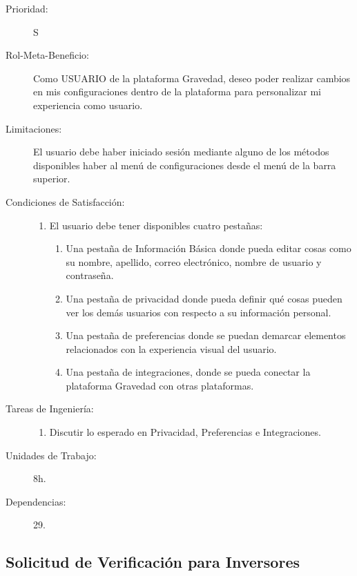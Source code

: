 \begin{description}
    \item[Prioridad:] S
    \item[Rol-Meta-Beneficio:]  Como USUARIO de la plataforma Gravedad, deseo poder realizar cambios en mis configuraciones dentro de la plataforma para personalizar mi experiencia como usuario.
    \item[Limitaciones:] El usuario debe haber iniciado sesión mediante alguno de los métodos disponibles haber al menú de configuraciones desde el menú de la barra superior.
    \item[Condiciones de Satisfacción:]  \hfill
        \begin{enumerate}
            \item El usuario debe tener disponibles cuatro pestañas:
                \begin{enumerate}
                    \item Una pestaña de Información Básica donde pueda editar cosas como su nombre, apellido, correo electrónico, nombre de usuario y contraseña.
    			    \item Una pestaña de privacidad donde pueda definir qué cosas pueden ver los demás usuarios con respecto a su información personal.
    			    \item Una pestaña de preferencias donde se puedan demarcar elementos relacionados con la experiencia visual del usuario.
    			    \item Una pestaña de integraciones, donde se pueda conectar la plataforma Gravedad con otras plataformas.
                \end{enumerate}
        \end{enumerate}
    \item[Tareas de Ingeniería:]  \hfill
        \begin{enumerate}
            \item Discutir lo esperado en Privacidad, Preferencias e Integraciones.
        \end{enumerate}
    \item[Unidades de Trabajo:] 8h.
    \item[Dependencias:] 29.
\end{description}

\newpage


\subsection{Solicitud de Verificación para Inversores}

